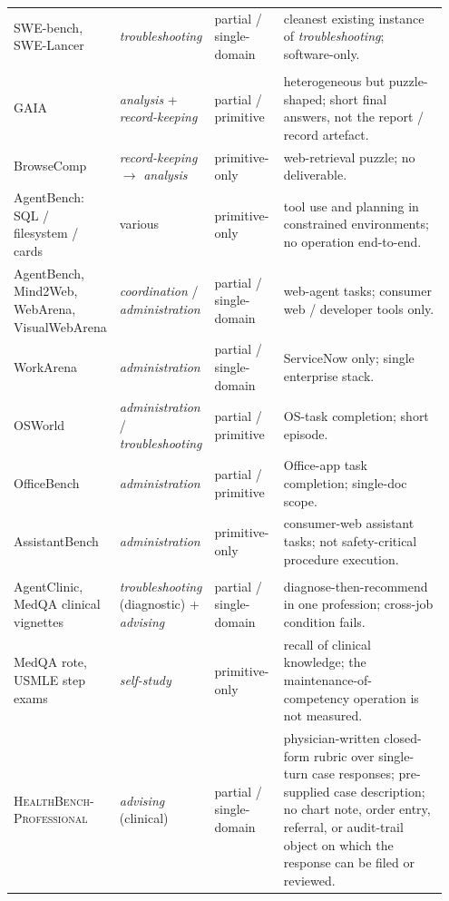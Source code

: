 \documentclass{article}
\begin{document}
\begin{table}[!htbp]
\begin{tabular}{p{0.21\linewidth} p{0.18\linewidth} p{0.16\linewidth} p{0.40\linewidth}}
SWE-bench, SWE-Lancer               & \emph{troubleshooting}            & partial / single-domain & cleanest existing instance of \emph{troubleshooting}; software-only. \\
\addlinespace[2pt]
\multicolumn{4}{l}{\textit{Agent and workflow benchmarks.}} \\
GAIA                                & \emph{analysis} + \emph{record-keeping} & partial / primitive & heterogeneous but puzzle-shaped; short final answers, not the report / record artefact. \\
BrowseComp                          & \emph{record-keeping} $\to$ \emph{analysis} & primitive-only & web-retrieval puzzle; no deliverable. \\
AgentBench: SQL / filesystem / cards & various                            & primitive-only         & tool use and planning in constrained environments; no operation end-to-end. \\
AgentBench, Mind2Web, WebArena, VisualWebArena & \emph{coordination} / \emph{administration} & partial / single-domain & web-agent tasks; consumer web / developer tools only. \\
WorkArena                           & \emph{administration}             & partial / single-domain & ServiceNow only; single enterprise stack. \\
OSWorld                             & \emph{administration} / \emph{troubleshooting} & partial / primitive & OS-task completion; short episode. \\
OfficeBench                         & \emph{administration}             & partial / primitive     & Office-app task completion; single-doc scope. \\
AssistantBench                      & \emph{administration}             & primitive-only          & consumer-web assistant tasks; not safety-critical procedure execution. \\
\addlinespace[2pt]
\multicolumn{4}{l}{\textit{Clinical, creative, and dialogue.}} \\
AgentClinic, MedQA clinical vignettes & \emph{troubleshooting} (diagnostic) + \emph{advising} & partial / single-domain & diagnose-then-recommend in one profession; cross-job condition fails. \\
MedQA rote, USMLE step exams        & \emph{self-study}                & primitive-only          & recall of clinical knowledge; the maintenance-of-competency operation is not measured. \\
\textsc{HealthBench-Professional}~\citep{arora2025healthbench}   & \emph{advising} (clinical)        & partial / single-domain & physician-written closed-form rubric over single-turn case responses; pre-supplied case description; no chart note, order entry, referral, or audit-trail object on which the response can be filed or reviewed. \\

\end{tabular}
\end{table}
\end{document}
